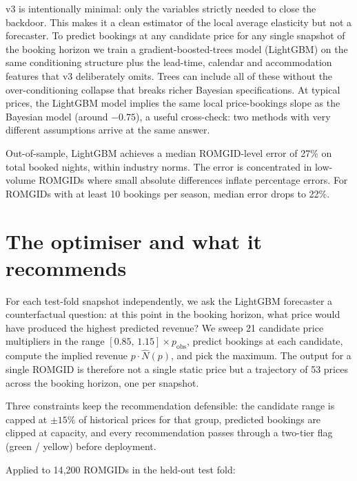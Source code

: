 \documentclass[11pt,a4paper]{article}
\begin{document}
v3 is intentionally minimal: only the variables strictly needed to close the backdoor. This makes it a clean estimator of the local average elasticity but not a forecaster. To predict bookings at any candidate price for any single snapshot of the booking horizon we train a gradient-boosted-trees model (LightGBM) on the same conditioning structure plus the lead-time, calendar and accommodation features that v3 deliberately omits. Trees can include all of these without the over-conditioning collapse that breaks richer Bayesian specifications. At typical prices, the LightGBM model implies the same local price-bookings slope as the Bayesian model (around $-0.75$), a useful cross-check: two methods with very different assumptions arrive at the same answer.

Out-of-sample, LightGBM achieves a median ROMGID-level error of 27\% on total booked nights, within industry norms. The error is concentrated in low-volume ROMGIDs where small absolute differences inflate percentage errors. For ROMGIDs with at least 10 bookings per season, median error drops to 22\%.

\section{The optimiser and what it recommends}

For each test-fold snapshot independently, we ask the LightGBM forecaster a counterfactual question: at this point in the booking horizon, what price would have produced the highest predicted revenue? We sweep 21 candidate price multipliers in the range $[0.85,\, 1.15] \times p_{\mathrm{obs}}$, predict bookings at each candidate, compute the implied revenue $p \cdot \hat{N}(p)$, and pick the maximum. The output for a single ROMGID is therefore not a single static price but a trajectory of 53 prices across the booking horizon, one per snapshot.

Three constraints keep the recommendation defensible: the candidate range is capped at $\pm 15\%$ of historical prices for that group, predicted bookings are clipped at capacity, and every recommendation passes through a two-tier flag (green / yellow) before deployment.

Applied to 14{,}200 ROMGIDs in the held-out test fold:
\end{document}
